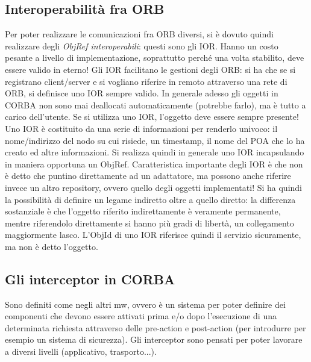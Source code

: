 \subsection{Interoperabilità fra ORB}
Per poter realizzare le comunicazioni fra ORB diversi, si è dovuto quindi realizzare degli \textit{ObjRef
interoperabili}: questi sono gli IOR. Hanno un costo pesante a livello di implementazione, soprattutto perché una volta
stabilito, deve essere valido in eterno!
Gli IOR facilitano le gestioni degli ORB: si ha che se si registrano client/server e si vogliano riferire in remoto
attraverso una rete di ORB, si definisce uno IOR sempre valido. In generale adesso gli oggetti in CORBA non sono mai
deallocati automaticamente (potrebbe farlo), ma è tutto a carico dell'utente. Se si utilizza uno IOR, l'oggetto deve
essere sempre presente!
Uno IOR è costituito da una serie di informazioni per renderlo univoco: il nome/indirizzo del nodo su cui risiede, un
timestamp, il nome del POA che lo ha creato ed altre informazioni. Si realizza quindi in generale uno IOR incapsulando
in maniera opportuna un ObjRef.
Caratteristica importante degli IOR è che non è detto che puntino direttamente ad un adattatore, ma possono anche
riferire invece un altro repository, ovvero quello degli oggetti implementati! Si ha quindi la possibilità di
definire un legame indiretto oltre a quello diretto: la differenza sostanziale è che l'oggetto riferito indirettamente è
veramente permanente, mentre riferendolo direttamente si hanno più gradi di libertà, un collegamento maggiormente
lasco. L'ObjId di uno IOR riferisce quindi il servizio sicuramente, ma non è detto l'oggetto.
\subsection{Gli interceptor in CORBA}
Sono definiti come negli altri mw, ovvero è un sistema per poter definire dei componenti che devono essere attivati
prima e/o dopo l'esecuzione di una determinata richiesta attraverso delle pre-action e post-action (per introdurre per esempio un sistema di sicurezza). Gli
interceptor sono pensati per poter lavorare a diversi livelli (applicativo, trasporto...).
